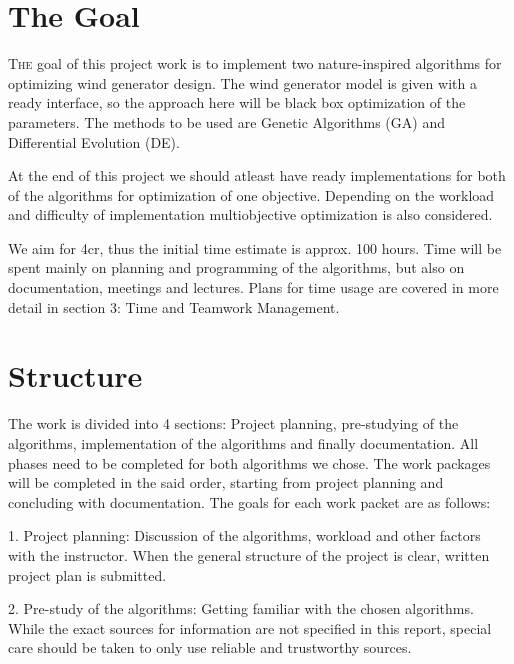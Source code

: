 \documentclass[twoside]{article}
\begin{document}
\begin{multicols}{2} %

\section{The Goal}

\lettrine[nindent=0em,lines=3]{T}{he} goal of this project work is to implement two nature-inspired algorithms for optimizing wind generator design. The wind generator model is given with a ready interface, so the approach here will be black box optimization of the parameters. The methods to be used are Genetic Algorithms (GA) and Differential Evolution (DE). 

At the end of this project we should atleast have ready implementations for both of the algorithms for optimization of one objective. Depending on the workload and difficulty of implementation multiobjective optimization is also considered.

We aim for 4cr, thus the initial time estimate is approx. 100 hours. Time will be spent mainly on planning and programming of the algorithms, but also on documentation, meetings and lectures. Plans for time usage are covered in more detail in section 3: Time and Teamwork Management.


\section{Structure}

The work is divided into 4 sections: Project planning, pre-studying of the algorithms, implementation of the algorithms and finally documentation. All phases need to be completed for both algorithms we chose. The work packages will be completed in the said order, starting from project planning and concluding with documentation. The goals for each work packet are as follows:

1. Project planning:
Discussion of the algorithms, workload and other factors with the instructor. When the general structure of the project is clear, written project plan is submitted.

2. Pre-study of the algorithms:
Getting familiar with the chosen algorithms. While the exact sources for information are not specified in this report, special care should be taken to only use reliable and trustworthy sources.


\end{multicols}
\end{document}
